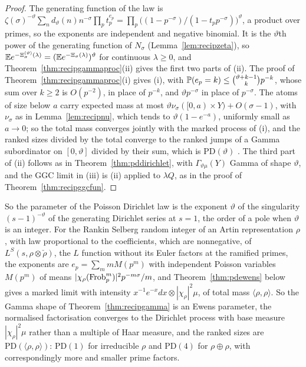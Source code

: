 \begin{proof}
The generating function of the law is $\zeta(\sigma)^{-\vartheta}\sum_nd_\vartheta(n)n^{-\sigma}\prod_pt_p^{e_p}=\prod_p\bigl((1-p^{-\sigma})/(1-t_pp^{-\sigma})\bigr)^\vartheta$, a product over primes, so the exponents are independent and negative binomial. It is the $\vartheta$th power of the generating function of $N_\sigma$ (Lemma~\ref{lem:recipzeta}), so $\mathbb{E} e^{-\Xi^{(\vartheta)}_\sigma(\lambda)}=(\mathbb{E} e^{-\Xi_\sigma(\lambda)})^\vartheta$ for continuous $\lambda\ge0$, and Theorem~\ref{thm:recipgammaproc}(ii) gives the first two parts of (ii). The proof of Theorem~\ref{thm:recipgammaproc}(i) gives (i), with $\mathbb{P}(e_p=k)\le\binom{\vartheta+k-1}kp^{-k}$, whose sum over $k\ge2$ is $O(p^{-2})$, in place of $p^{-k}$, and $\vartheta p^{-\sigma}$ in place of $p^{-\sigma}$. The atoms of size below $a$ carry expected mass at most $\vartheta\nu_\sigma([0,a)\times Y)+O(\sigma-1)$, with $\nu_\sigma$ as in Lemma~\ref{lem:recipnu}, which tends to $\vartheta(1-e^{-a})$, uniformly small as $a\to0$; so the total mass converges jointly with the marked process of (i), and the ranked sizes divided by the total converge to the ranked jumps of a Gamma subordinator on $[0,\vartheta]$ divided by their sum, which is $\mathrm{PD}(\vartheta)$ \cite{kingman1975}. The third part of (ii) follows as in Theorem~\ref{thm:pddirichlet}, with $\Gamma_{\vartheta\mu}(Y)$ Gamma of shape $\vartheta$, and the GGC limit in (iii) is (ii) applied to $\lambda Q$, as in the proof of Theorem~\ref{thm:recipggcfun}.
\end{proof}

So the parameter of the Poisson Dirichlet law is the exponent $\vartheta$ of the singularity $(s-1)^{-\vartheta}$ of the generating Dirichlet series at $s=1$, the order of a pole when $\vartheta$ is an integer. For the Rankin Selberg random integer of an Artin representation $\rho$, with law proportional to the coefficients, which are nonnegative, of $L^S(s,\rho\otimes\check\rho)$, the $L$ function without its Euler factors at the ramified primes, the exponents are $e_p=\sum_mmM(p^m)$ with independent Poisson variables $M(p^m)$ of means $|\chi_\rho(\operatorname{Frob}_p^m)|^2p^{-m\sigma}/m$, and Theorem~\ref{thm:pdewens} below gives a marked limit with intensity $x^{-1}e^{-x}dx\otimes|\chi_\rho|^2\mu$, of total mass $\langle\rho,\rho\rangle$. So the Gamma shape of Theorem~\ref{thm:recipgamma} is an Ewens parameter, the normalised factorisation converges to the Dirichlet process with base measure $|\chi_\rho|^2\mu$ rather than a multiple of Haar measure, and the ranked sizes are $\mathrm{PD}(\langle\rho,\rho\rangle)$: $\mathrm{PD}(1)$ for irreducible $\rho$ and $\mathrm{PD}(4)$ for $\rho\oplus\rho$, with correspondingly more and smaller prime factors.

